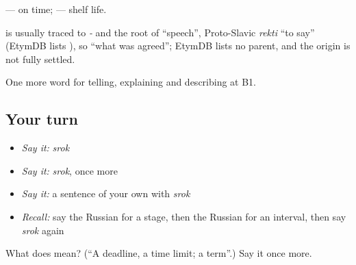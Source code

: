 \emph{ } — on time; \emph{ } — shelf life.

\begin{cousinweb}
\emph{} is usually traced to \emph{-} and the root of \emph{} \textquotedblleft{}speech\textquotedblright{}, Proto-Slavic \emph{rekti} \textquotedblleft{}to say\textquotedblright{} (EtymDB lists \emph{}), so \textquotedblleft{}what was agreed\textquotedblright{}; EtymDB lists no parent, and the origin is not fully settled.
\end{cousinweb}

\begin{grammarlens}[title={What you've built}]
One more word for telling, explaining and describing at B1.
\end{grammarlens}

\subsection*{Your turn}
\begin{itemize}
\raggedright
  \item \emph{Say it:} \emph{srok}
  \item \emph{Say it:} \emph{srok}, once more
  \item \emph{Say it:} a sentence of your own with \emph{srok}
  \item \emph{Recall:} say the Russian for a stage, then the Russian for an interval, then say \emph{srok} again
\end{itemize}

\begin{tcolorbox}[breakable,colback=teal!4,colframe=teal!35!black,title={Before you move on}]
What does  mean? (\textquotedblleft{}A deadline, a time limit; a term\textquotedblright{}.) Say it once more.
\end{tcolorbox}
